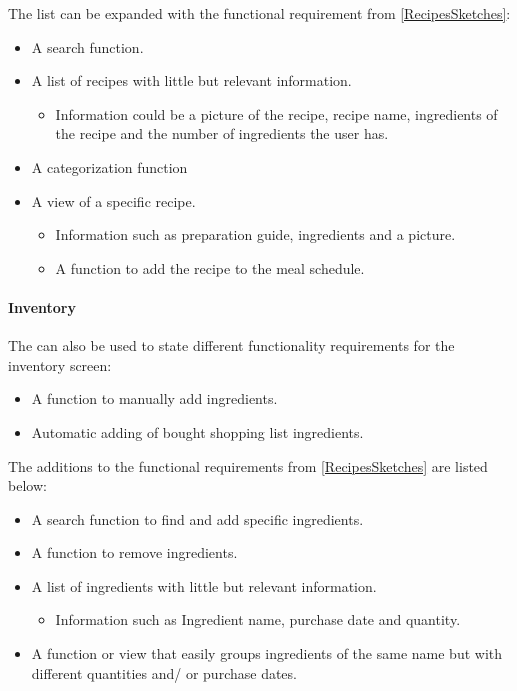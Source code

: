 The list can be expanded with the functional requirement from  \cref{RecipesSketches}:

\begin{itemize}
	\item A search function.
	\item A list of recipes with little but relevant information.
		\begin{itemize}
			\item Information could be a picture of the recipe, recipe name, ingredients of the recipe and the number of ingredients the user has.
		\end{itemize}
	\item A categorization function
	\item A view of a specific recipe.
		\begin{itemize}
			\item Information such as preparation guide, ingredients and a picture.
			\item A function to add the recipe to the meal schedule.
		\end{itemize}
\end{itemize}

\paragraph{Inventory}
The  can also be used to state different functionality requirements for the inventory screen:

\begin{itemize}
	\item A function to manually add ingredients.
	\item Automatic adding of bought shopping list ingredients.
\end{itemize}

The additions to the functional requirements from  \cref{RecipesSketches} are listed below:

\begin{itemize}
	\item A search function to find and add specific ingredients.
	\item A function to remove ingredients.
	\item A list of ingredients with little but relevant information.
		\begin{itemize}
			\item Information such as Ingredient name, purchase date and quantity.
		\end{itemize}
	\item A function or view that easily groups ingredients of the same name but with different quantities and/ or purchase dates.
\end{itemize}  

